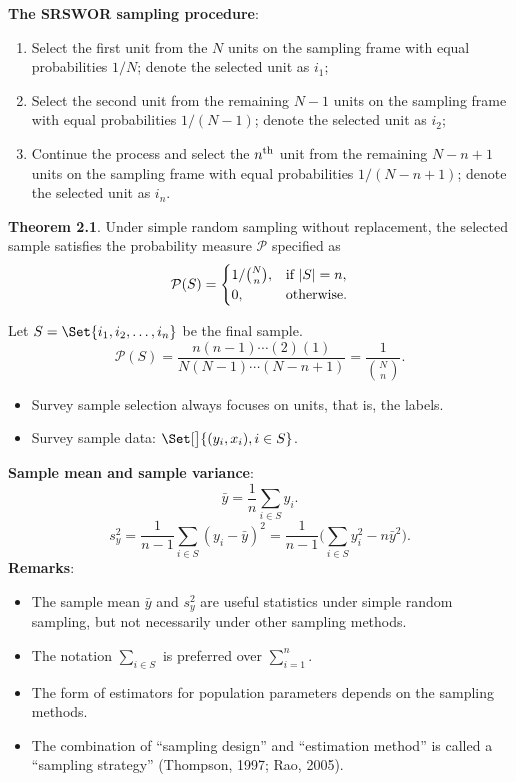 \textbf{The SRSWOR sampling procedure}:
\begin{enumerate}
      \item Select the first unit from the $N$ units on the sampling frame with
            equal probabilities $1/N$; denote the selected unit as $i_1$;
      \item Select the second unit from the remaining $ N-1 $ units on the
            sampling frame with equal probabilities $ 1/(N-1) $; denote the
            selected unit as $i_2$;
      \item Continue the process and select the $n\textsuperscript{th}$ unit from the remaining
            $ N-n+1 $ units on the sampling frame with equal probabilities
            $ 1/(N-n+1) $; denote the selected unit as $ i_n $.
\end{enumerate}

\textbf{Theorem 2.1}. Under simple random sampling without replacement,
the selected sample satisfies the probability measure $ \mathcal{P} $ specified as
\[ \mathcal{P}(S)=\begin{cases}
            1/\binom{N}{n}, & \text{if $ \lvert S\rvert=n $}, \\
            0,              & \text{otherwise}.
      \end{cases} \]

Let $ S=\Set{i_1,i_2,\ldots,i_n} $ be the final sample.
\[ \mathcal{P}(S)=\frac{n(n-1)\cdots(2)(1)}{N(N-1)\cdots(N-n+1)}=\frac{1}{\binom{N}{n}}. \]
\begin{itemize}
      \item Survey sample selection always focuses on units, that is, the labels.
      \item Survey sample data: $ \Set[\big]{(y_i,x_i),i\in S} $.
\end{itemize}

\textbf{Sample mean and sample variance}:
\[ \bar{y}=\frac{1}{n}\sum_{i\in S}y_i. \]
\[ s_y^2=\frac{1}{n-1}\sum_{i\in S}(y_i-\bar{y})^2=\frac{1}{n-1}\biggl(\sum_{i\in S}y_i^2-n\bar{y}^2\biggr). \]
\textbf{Remarks}:
\begin{itemize}
      \item The sample mean $ \bar{y} $ and $ s_y^2 $ are useful
            statistics under simple random sampling, but not necessarily under
            other sampling methods.
      \item The notation $ \sum_{i\in S} $ is preferred over
            $ \sum_{i=1}^{n} $.
      \item The form of estimators for population parameters depends on the
            sampling methods.
      \item The combination of ``sampling design'' and ``estimation method''
            is called a ``sampling strategy'' (Thompson, 1997; Rao, 2005).
\end{itemize}


